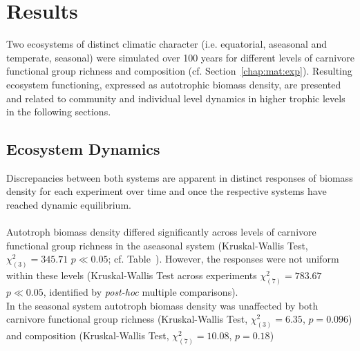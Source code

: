 \chapter{Results}
\label{chap:res}
Two ecosystems of distinct climatic character (i.e. equatorial, aseasonal and temperate, seasonal) were simulated over 100 years for different levels of carnivore functional group richness and composition (cf. Section~\ref{chap:mat:exp}). 
Resulting ecosystem functioning, expressed as autotrophic biomass density, are presented and related to community and individual level dynamics in higher trophic levels in the following sections.
%
\section{Ecosystem Dynamics}
\label{chap:res:dyn} 
Discrepancies between both systems are apparent in distinct responses of biomass density for each experiment over time and once the respective systems have reached dynamic equilibrium.\\\\
Autotroph biomass density differed significantly across levels of carnivore functional group richness in the aseasonal system (Kruskal-Wallis Test, $\chi^{2}_{(3)} = 345.71$ $p \ll 0.05$; cf. Table~). 
However, the responses were not uniform within these levels (Kruskal-Wallis Test across experiments $\chi^{2}_{(7)} = 783.67$ $p \ll 0.05$, identified by \textit{post-hoc} multiple comparisons). \\
In the seasonal system autotroph biomass density was unaffected by both carnivore functional group richness (Kruskal-Wallis Test, $\chi^{2}_{(3)} = 6.35$, $p = 0.096$) and composition (Kruskal-Wallis Test, $\chi^{2}_{(7)} = 10.08$, $p = 0.18$)
